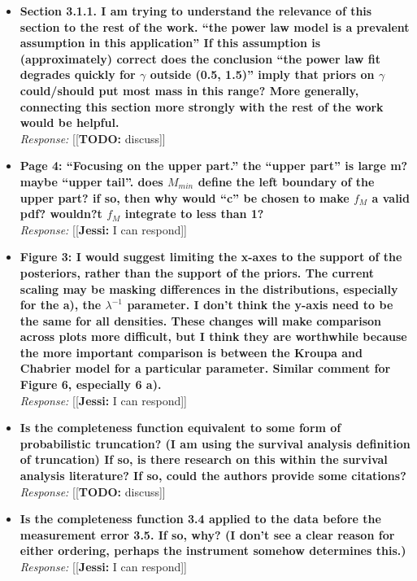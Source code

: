 \documentclass[11pt, oneside]{article}   	%
\newcommand{\jessi}[1]{{\color{blue}[[\textbf{Jessi: }#1]]}}
\newcommand{\todo}[1]{{\color{red}[[\textbf{TODO: }#1]]}}
\begin{document}
\begin{itemize}
\item  {\bf Section 3.1.1. I am trying to understand the relevance of this section to the rest of the work. ``the power law model is a prevalent assumption in this application'' If this assumption is (approximately) correct does the conclusion ``the power law fit degrades quickly for $\gamma$ outside (0.5, 1.5)'' imply that priors on $\gamma$ could/should put most mass in this range? More generally, connecting this section more strongly with the rest of the work would be helpful.} \\
\noindent \emph{Response:} \todo{discuss}
\bigskip

\item {\bf Page 4: ``Focusing on the upper part.'' the ``upper part'' is large m? maybe ``upper tail''. does $M_{min}$ define the left boundary of the upper part? if so, then why would ``c'' be chosen to make $f_M$ a valid pdf? wouldn?t $f_M$ integrate to less than 1?} \\
\noindent \emph{Response:} \jessi{I can respond}
\bigskip

\item {\bf Figure 3: I would suggest limiting the x-axes to the support of the posteriors, rather than the support of the priors. The current scaling may be masking differences in the
distributions, especially for the a), the $\lambda^{-1}$ parameter. I don't think the y-axis need to be the same for all densities. These changes will make comparison across plots more difficult, but I think they are worthwhile because the more important comparison is between the Kroupa and Chabrier model for a particular parameter. Similar comment for Figure 6, especially 6 a).} \\
\noindent \emph{Response:} \jessi{I can respond}
\bigskip

\item {\bf Is the completeness function equivalent to some form of probabilistic truncation? (I am using the survival analysis definition of truncation) If so, is there research on this within the survival analysis literature? If so, could the authors provide some citations?} \\
\noindent \emph{Response:} \todo{discuss}
\bigskip

\item {\bf Is the completeness function 3.4 applied to the data before the measurement error 3.5. If so, why? (I don't see a clear reason for either ordering, perhaps the instrument somehow determines this.)} \\
\noindent \emph{Response:} \jessi{I can respond}
\bigskip


\end{itemize}
\end{document}
